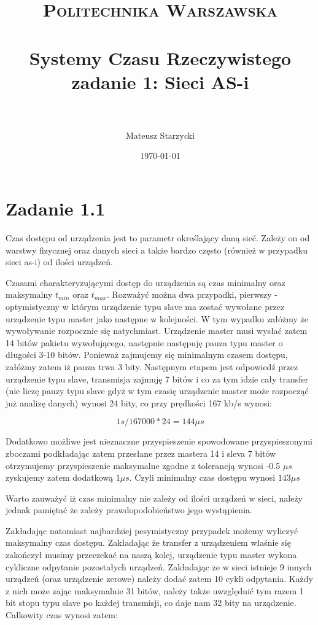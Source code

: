 \documentclass[paper=a4, fontsize=11pt]{scrartcl} %
\title{ 
    \normalfont \normalsize 
    \textsc{Politechnika Warszawska} \\ [25pt] %
    \horrule{0.5pt} \\[0.4cm] %
    \huge Systemy Czasu Rzeczywistego zadanie 1: Sieci AS-i\\ %
    \horrule{2pt} \\[0.5cm] %
}
\author{Mateusz Starzycki} %
\date{\normalsize\today} %
\numberwithin{equation}{section} %
\numberwithin{figure}{section} %
\numberwithin{table}{section} %
\begin{document}
\maketitle %


\newpage

\section{Zadanie 1.1}

Czas dostępu od urządzenia jest to parametr określający daną sieć.
Zależy on od warstwy fizycznej oraz danych sieci a także bardzo często (również w przypadku sieci as-i) od ilości urządzeń.

Czasami charakteryzującymi dostęp do urządzenia są czas minimalny oraz maksymalny \(t_{min}\) oraz \(t_{max}\).
Rozważyć można dwa przypadki, pierwszy - optymistyczny w którym urządzenie typu slave ma zostać wywołane przez urządzenie
typu master jako następne w kolejności. W tym wypadku załóżmy że wywoływanie rozpocznie się natychmiast. Urządzenie master
musi wysłać zatem 14 bitów pakietu wywołującego, następnie następuję pauza typu master o długości 3-10 bitów.
Ponieważ zajmujemy się minimalnym czasem dostępu, załóżmy zatem iż pauza trwa 3 bity. Następnym etapem jest odpowiedź
przez urządzenie typu slave, transmisja zajmuję 7 bitów i co za tym idzie cały transfer (nie liczę pauzy typu slave gdyż w tym czasię
urządzenie master może rozpocząć już analizę danych) wynosi 24 bity, co przy prędkości 167 kb/s wynosi:

\[1s / 167000 * 24 = 144 \mu s\]

Dodatkowo możliwe jest nieznaczne przyspieszenie spowodowane przyspieszonymi zboczami podkładając zatem przesłane przez mastera 14 i sleva
7 bitów otrzymujemy przyspieszenie maksymalne zgodne z tolerancją wynosi -0.5 \(\mu s\) zyskujemy zatem dodatkową \(1 \mu s\).
Czyli minimalny czas dostępu wynosi \(143 \mu s\)


Warto zauważyć iż czas minimalny nie zależy od ilości urządzeń w sieci, należy jednak pamiętać że zależy prawdopodobieństwo jego wystąpienia.

Zakładając natomiast najbardziej pesymistyczny przypadek możemy wyliczyć maksymalny czas dostępu. Zakładając że transfer z urządzeniem
właśnie się zakończył musimy przeczekać na naszą kolej, urządzenie typu master wykona cykliczne odpytanie pozostałych urządzeń.
Zakładając że w sieci istnieje 9 innych urządzeń (oraz urządzenie zerowe) należy dodać zatem 10 cykli odpytania. Każdy z nich może zając
maksymalnie 31 bitów, należy także uwzględnić tym razem 1 bit stopu typu slave po każdej transmisji, co daje nam 32 bity na urządzenie.
Całkowity czas wynosi zatem:
\end{document}
